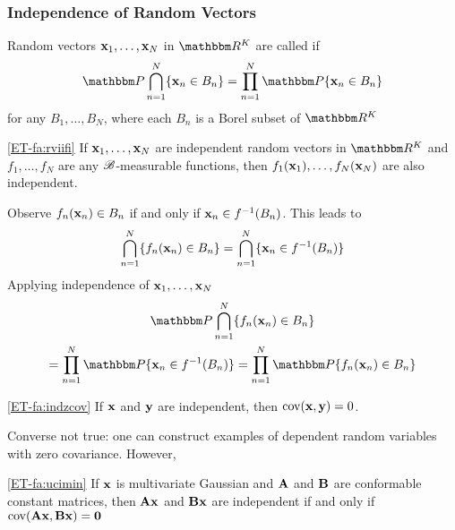 \begin{frame}\frametitle{Independence of Random Vectors}

    \vspace{2em}
    Random vectors ${\mathbf x}_1, \ldots, {\mathbf x}_N$ in $\RR^K$ are called
     if
    \begin{equation*}
        \label{eq:bcapv}
        \PP \bigcap_{n=1}^N \{\boldx_n \in B_n\}
        = \prod_{n=1}^N \PP\{\boldx_n \in B_n\} 
    \end{equation*}
    for any $B_1, \ldots, B_N$, where each $B_n$ is a Borel subset of $\RR^K$
    
\end{frame}

\begin{frame}
    
    \vspace{2em}
    \Fact\eqref{ET-fa:rviifi}
    If ${\mathbf x}_1, \ldots, {\mathbf x}_N$ are independent random vectors in $\RR^K$ and 
    $f_1, \ldots, f_N$ are any $\mathscr B$-measurable functions,
    then $f_1({\mathbf x}_1), \ldots, f_N({\mathbf x}_N)$ are also independent.
    
    \Prf 
    Observe  $f_n({\mathbf x}_n) \in B_n$ if and only if ${\mathbf x}_n \in
    f^{-1}(B_n)$. This leads to 
    \begin{equation*}
        \bigcap_{n=1}^N \{f_n({\mathbf x}_n) \in B_n\}
        = \bigcap_{n=1}^N \{{\mathbf x}_n \in f^{-1}(B_n)\}
    \end{equation*}
    Applying independence of ${\mathbf x}_1, \ldots, {\mathbf x}_N$
    \begin{multline*}
        \PP
        \bigcap_{n=1}^N \{f_n(\boldx_n) \in B_n\}
        \\ = \prod_{n=1}^N \PP \{\boldx_n \in f^{-1}(B_n)\}
        = \prod_{n=1}^N \PP \{f_n(\boldx_n) \in B_n\}
    \end{multline*}
    
\end{frame}

\begin{frame}

    \vspace{2em}
    \Fact\eqref{ET-fa:indzcov}
    If ${\mathbf x}$ and ${\mathbf y}$ are independent, then $\operatorname{cov}({\mathbf x},{\mathbf y}) = 0$.
        
    Converse not true:  one can construct examples of dependent
    random variables with zero covariance.  However,

    \Fact\eqref{ET-fa:ucimin}
    If ${\mathbf x}$ is multivariate Gaussian and $\mathbf A$ and $\mathbf B$ are
    conformable constant matrices, then $\mathbf A {\mathbf x}$ and
    $\mathbf B {\mathbf x}$ are independent if and only if $\operatorname{cov}(\mathbf A {\mathbf x}, \mathbf B{\mathbf x}) = {\mathbf 0}$
        
\end{frame}

